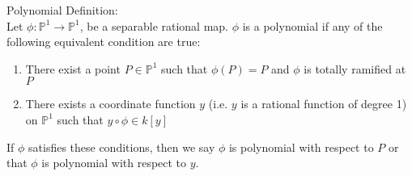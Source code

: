 \documentclass[aspectratio=169,xcolor=dvipsnames]{beamer}
\begin{document}
\begin{frame}{Polynomial}
    Definition: \\
    Let $\phi:\mathbb{P}^1\to\mathbb{P}^1$, be a separable rational map. $\phi$ is a polynomial if any of the following equivalent condition are true:
    \begin{enumerate}
        \item There exist a point $P\in \mathbb{P}^1$ such that $\phi(P) = P$ and $\phi$ is totally ramified at $P$
        \item There exists a coordinate function $y$ (i.e. $y$ is a rational function of degree 1) on $\mathbb{P}^1$ such that $y \circ \phi \in k[y]$
    \end{enumerate}
    If $\phi$ satisfies these conditions, then we say $\phi$ is polynomial with respect to $P$ or that $\phi$ is polynomial with respect to $y$.
\end{frame}
\end{document}
